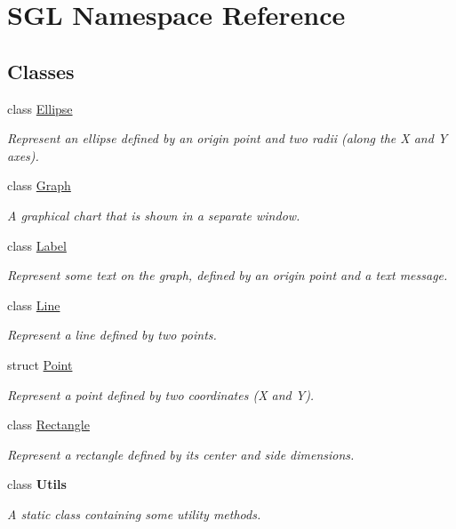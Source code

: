 \hypertarget{namespace_s_g_l}{}\section{S\+GL Namespace Reference}
\label{namespace_s_g_l}
\subsection*{Classes}
\begin{DoxyCompactItemize}
\item 
class \mbox{\hyperlink{class_s_g_l_1_1_ellipse}{Ellipse}}
\begin{DoxyCompactList}\small\item\em Represent an ellipse defined by an origin point and two radii (along the X and Y axes). \end{DoxyCompactList}\item 
class \mbox{\hyperlink{class_s_g_l_1_1_graph}{Graph}}
\begin{DoxyCompactList}\small\item\em A graphical chart that is shown in a separate window. \end{DoxyCompactList}\item 
class \mbox{\hyperlink{class_s_g_l_1_1_label}{Label}}
\begin{DoxyCompactList}\small\item\em Represent some text on the graph, defined by an origin point and a text message. \end{DoxyCompactList}\item 
class \mbox{\hyperlink{class_s_g_l_1_1_line}{Line}}
\begin{DoxyCompactList}\small\item\em Represent a line defined by two points. \end{DoxyCompactList}\item 
struct \mbox{\hyperlink{struct_s_g_l_1_1_point}{Point}}
\begin{DoxyCompactList}\small\item\em Represent a point defined by two coordinates (X and Y). \end{DoxyCompactList}\item 
class \mbox{\hyperlink{class_s_g_l_1_1_rectangle}{Rectangle}}
\begin{DoxyCompactList}\small\item\em Represent a rectangle defined by its center and side dimensions. \end{DoxyCompactList}\item 
class {\bfseries Utils}
\begin{DoxyCompactList}\small\item\em A static class containing some utility methods. \end{DoxyCompactList}\end{DoxyCompactItemize}
